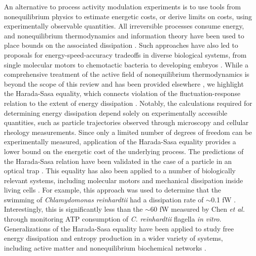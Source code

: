 \documentclass{compactarticle}
\begin{document}
An alternative to process activity modulation experiments is to use tools from nonequilibrium physics to estimate energetic costs, or derive limits on costs, using experimentally observable quantities. All irreversible processes consume energy, and nonequilibrium thermodynamics and information theory have been used to place bounds on the associated dissipation \cite{li2019quantifying,battle2016broken,tan2021scale}. Such approaches have also led to proposals for energy-speed-accuracy tradeoffs in diverse biological systems, from single molecular motors to chemotactic bacteria to developing embryos \cite{song_energy_2019,yong2021,lan2021,horowitz2020}.
While a comprehensive treatment of the active field of nonequilibrium thermodynamics is beyond the scope of this review and has been provided elsewhere \cite{fang_nonequilibrium_2019}, we  highlight the Harada-Sasa equality, which connects violation of the fluctuation-response relation to the extent of energy dissipation \cite{harada_equality_2005}. Notably, the calculations required for determining energy dissipation depend solely on experimentally accessible quantities, such as particle trajectories observed through microscopy and cellular rheology measurements. Since only a limited number of degrees of freedom can be experimentally measured, application of the Harada-Sasa equality provides a lower bound on the energetic cost of the underlying process. The predictions of the Harada-Sasa relation have been validated in the case of a particle in an optical trap \cite{toyabe_experimental_2007}.
This equality has also been applied to a number of biologically relevant systems, including molecular motors \cite{harada_fluctuations_2007} and mechanical dissipation inside living cells \cite{fodor_nonequilibrium_2016,bohec_distribution_2019}. For example, this approach was used to determine that the swimming of \textit{Chlamydomonas reinhardtii} had a dissipation rate of $\sim$0.1 fW \cite{jones_stochastic_2021}. Interestingly, this is significantly less than the $\sim$60 fW measured by Chen \textit{et al.} \cite{chen_atp_2015} through monitoring ATP consumption of \textit{C. reinhardtii} flagella \textit{in vitro}. Generalizations of the Harada-Sasa equality have been applied to study free energy dissipation and entropy production in a wider variety of systems, including active matter and nonequilibrium biochemical networks \cite{nardini_entropy_2017,muy_non-invasive_2013,dechant_improving_2021,gingrich_inferring_2017,barato_thermodynamic_2015,wang_landscape_2015}. 
\end{document}
